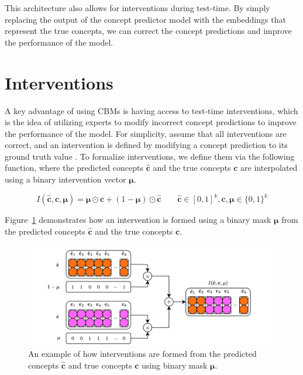 This architecture also allows for interventions during test-time. By simply replacing
the output of the concept predictor model with the embeddings that represent
the true concepts, we can correct the concept predictions
 and improve the performance of the model. 


\section{Interventions}
A key advantage of using CBMs is having access to 
test-time interventions, which is the idea of utilizing experts
to modify incorrect concept predictions to improve the 
performance of the model.
For simplicity, assume that
all interventions are correct,  
and an intervention is defined by 
modifying a concept prediction to its ground truth value
. To formalize interventions, we define
them via the following function, where
the predicted concepts $\hat{\mathbf{c}}$ and the true concepts $\mathbf{c}$ are interpolated
using a binary intervention vector $\bm{\mu}$.

\begin{equation}\label{equation:intervention}
I(\hat{\mathbf{c}}, \mathbf{c}, \bm{\mu}) = 
\bm{\mu} \odot \mathbf{c} + (1 - \bm{\mu}) \odot \hat{\mathbf{c}} \qquad \hat{\mathbf{c}} \in [0,1]^k, \mathbf{c}, \bm{\mu} \in \{0, 1\}^k
\end{equation}

Figure~\ref{fig:interventions} demonstrates how an intervention
is formed using 
a binary mask $\bm{\mu}$ from the predicted concepts $\hat{\mathbf{c}}$ and the true concepts $\mathbf{c}$.

\begin{figure}[!ht]
    \centering
    \includegraphics[width=\textwidth]{figs/method/interventions.png}
    \caption{An example of how interventions are formed from the predicted concepts $\hat{\mathbf{c}}$
    and true concepts $\mathbf{c}$
     using binary mask $\bm{\mu}$.}
    \label{fig:interventions}
\end{figure}

